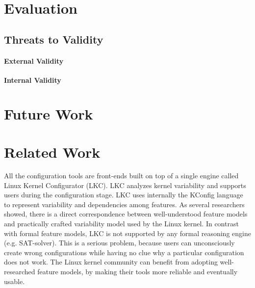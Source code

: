 \documentclass{chi2009}
\newcommand{\todo}[1]{\textsf{\textbf{\textcolor{Orange}{[[#1]]}}}}
\begin{document}



\section{Evaluation}\label{sec:evaluation}


\subsection{Threats to Validity}

\paragraph{External Validity}

\paragraph{Internal Validity}

\section{Future Work}\label{sec:futurework}



\section{Related Work}\label{sec:relatedwork}

All the configuration tools are front-ends built on top of a single engine called Linux Kernel Configurator (LKC). LKC analyzes kernel variability and supports users during the configuration stage. LKC uses internally the KConfig language to represent variability and dependencies among features. As several researchers \cite{sincero:lkc:2008,she:kernel:2010} showed, there is a direct correspondence between well-understood feature models and practically crafted variability model used by the Linux kernel. In contrast with formal feature models, LKC is not supported by any formal reasoning engine (e.g. SAT-solver). This is a serious problem, because users can unconsciously create wrong configurations while having no clue why a particular configuration does not work. The Linux kernel community can benefit from adopting well-researched feature models, by making their tools more reliable and eventually usable.
\end{document}
